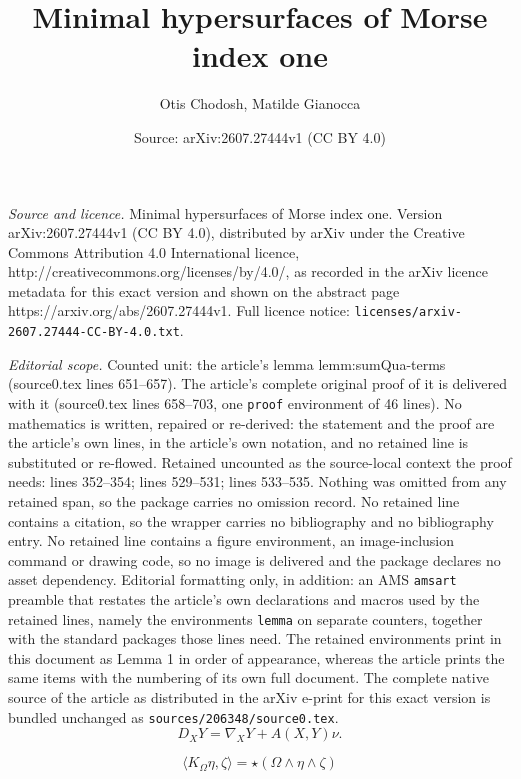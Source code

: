 \documentclass[10pt,a4paper]{amsart}
\title{Minimal hypersurfaces of Morse index one}
\author{Otis Chodosh, Matilde Gianocca}
\date{Source: arXiv:2607.27444v1 (CC BY 4.0)}
\newcommand{\bangle}[1]{\langle #1 \rangle}
\begin{document}
\maketitle

\noindent\emph{Source and licence.} Minimal hypersurfaces of Morse index one. Version arXiv:2607.27444v1 (CC BY 4.0), distributed by arXiv under the Creative Commons Attribution 4.0 International licence, http://creativecommons.org/licenses/by/4.0/, as recorded in the arXiv licence metadata for this exact version and shown on the abstract page https://arxiv.org/abs/2607.27444v1. Full licence notice: \texttt{licenses/arxiv-2607.27444-CC-BY-4.0.txt}.\par\smallskip

\noindent\textit{Editorial scope.} Counted unit: the article's lemma lemm:sumQua-terms (source0.tex lines 651--657). The article's complete original proof of it is delivered with it (source0.tex lines 658--703, one \texttt{proof} environment of 46 lines). No mathematics is written, repaired or re-derived: the statement and the proof are the article's own lines, in the article's own notation, and no retained line is substituted or re-flowed.  Retained uncounted as the source-local context the proof needs: lines 352--354; lines 529--531; lines 533--535.  Nothing was omitted from any retained span, so the package carries no omission record.  No retained line contains a citation, so the wrapper carries no bibliography and no bibliography entry.  No retained line contains a figure environment, an image-inclusion command or drawing code, so no image is delivered and the package declares no asset dependency.  Editorial formatting only, in addition: an AMS \texttt{amsart} preamble that restates the article's own declarations and macros used by the retained lines, namely the environments \texttt{lemma} on separate counters, together with the standard packages those lines need.  The retained environments print in this document as Lemma 1 in order of appearance, whereas the article prints the same items with the numbering of its own full document.  The complete native source of the article as distributed in the arXiv e-print for this exact version is bundled unchanged as \texttt{sources/206348/source0.tex}.
\begin{equation}\label{eq:D-nabla}
D_X Y = \nabla_X Y + A(X,Y) \nu .
\end{equation}

\begin{equation}\label{eq:K_omega-pairing}
\bangle{K_\Omega \eta,\zeta} = \star (\Omega \wedge \eta\wedge \zeta)
\end{equation}
\end{document}
